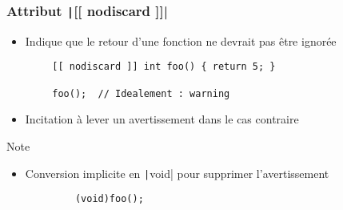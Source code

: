 \documentclass[C++.tex]{subfiles}
\begin{document}
\begin{frame}[fragile]
	\frametitle{Attribut \texttt|[[ nodiscard ]]|}
	\begin{itemize}
		\item Indique que le retour d'une fonction ne devrait pas être ignorée
	\end{itemize}

	\begin{verbatim}
		[[ nodiscard ]] int foo() { return 5; }

		foo();  // Idealement : warning
	\end{verbatim}

	\begin{itemize}
		\item Incitation à lever un avertissement dans le cas contraire
	\end{itemize}

	\begin{block}{Note}
		\begin{itemize}
			\item Conversion implicite en \texttt|void| pour supprimer l'avertissement
		\end{itemize}

		\begin{verbatim}
			(void)foo();
		\end{verbatim}
	\end{block}

\end{frame}
\end{document}

